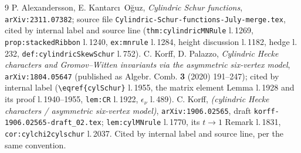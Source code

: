 \documentclass[11pt]{article}
\theoremstyle{plain}
\theoremstyle{definition}
\theoremstyle{remark}
\begin{document}
\begin{thebibliography}{9}
 P. Alexandersson, E. Kantarc\i\ O\u{g}uz, \emph{Cylindric Schur functions},
\texttt{arXiv:2311.07382}; source file \texttt{Cylindric-Schur-functions-July-merge.tex}, cited by
internal label and source line (\texttt{thm:cylindricMNRule} l.\,1269, \texttt{prop:stackedRibbon}
l.\,1240, \texttt{ex:mnrule} l.\,1284, height discussion l.\,1182, hedge l.\,232,
\texttt{def:cylindricSkewSchur} l.\,752).
 C. Korff, D. Palazzo, \emph{Cylindric Hecke characters and Gromov--Witten invariants
via the asymmetric six-vertex model}, \texttt{arXiv:1804.05647} (published as Algebr. Comb.
\textbf{3} (2020) 191--247); cited by internal label (\verb|\eqref{cylSchur}| l.\,1955, the matrix
element Lemma l.\,1928 and its proof l.\,1940--1955, \texttt{lem:CR} l.\,1922,
$\epsilon_\nu$ l.\,489).
 C. Korff, \emph{(cylindric Hecke characters / asymmetric six-vertex model)},
\texttt{arXiv:1906.02565}, draft \texttt{korff-1906.02565-draft\_02.tex}; \texttt{lem:cylMNrule}
l.\,1770, its $t\to1$ Remark l.\,1831, \texttt{cor:cylchi2cylschur} l.\,2037. Cited by internal
label and source line, per the same convention.
\end{thebibliography}
\end{document}
